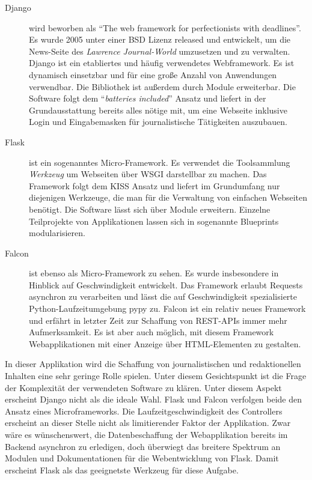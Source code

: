 \begin{description}
 \item [Django] wird beworben als "`The web framework for perfectionists with dead\-lines"'. Es wurde 2005 unter einer BSD Lizenz released und entwickelt, um die News-Seite des \textit{Lawrence Journal-World} umzusetzen und zu verwalten. Django ist ein etabliertes und häufig verwendetes Webframework. Es ist dynamisch einsetzbar und für eine große Anzahl von Anwendungen verwendbar. Die Bibliothek ist außerdem durch Module erweiterbar. Die Software folgt dem "`\textit{batteries included}"' Ansatz und liefert in der Grundausstattung bereits alles nötige mit, um eine Webseite inklusive Login und Eingabemasken für journalistische Tätigkeiten auszubauen.

 \item [Flask] ist ein sogenanntes Micro-Framework. Es verwendet die Toolsammlung \textit{Werkzeug} um Webseiten über WSGI darstellbar zu machen. Das Framework folgt dem KISS Ansatz und liefert im Grundumfang nur diejenigen Werkzeuge, die man für die Verwaltung von einfachen Webseiten benötigt. Die Software lässt sich über Module erweitern. Einzelne Teilprojekte von Applikationen lassen sich in sogenannte Blueprints modularisieren.

 \item [Falcon] ist ebenso als Micro-Framework zu sehen. Es wurde insbesondere in Hinblick auf Geschwindigkeit entwickelt. Das Framework erlaubt Requests asynchron zu verarbeiten und lässt die auf Geschwindigkeit spezialisierte Python-Laufzeitumgebung pypy zu. Falcon ist ein relativ neues Framework und erfährt in letzter Zeit zur Schaffung von REST-APIs immer mehr Aufmerksamkeit. Es ist aber auch möglich, mit diesem Framework Webapplikationen mit einer Anzeige über HTML-Elementen zu gestalten.
\end{description}

In dieser Applikation wird die Schaffung von journalistischen und redaktionellen Inhalten eine sehr geringe Rolle spielen. Unter diesem Gesichtspunkt ist die Frage der Komplexität der verwendeten Software zu klären. Unter diesem Aspekt erscheint Django nicht als die ideale Wahl.
Flask und Falcon verfolgen beide den Ansatz eines Microframeworks. Die Laufzeitgeschwindigkeit des Controllers erscheint an dieser Stelle nicht als limitierender Faktor der Applikation. Zwar wäre es wünschenswert, die Datenbeschaffung der Webapplikation bereits im Backend asynchron zu erledigen, doch überwiegt das breitere Spektrum an Modulen und Dokumentationen für die Webentwicklung von Flask.
Damit erscheint Flask als das geeignetste Werkzeug für diese Aufgabe.


